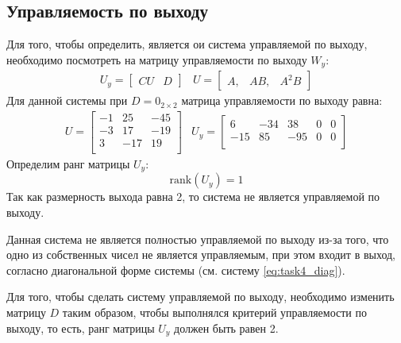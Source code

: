 \subsection{Управляемость по выходу}
Для того, чтобы определить, является ои система управляемой по выходу, необходимо посмотреть на 
матрицу управляемости по выходу $W_y$:
\begin{equation}
    \begin{array}{cc}
        U_y = \begin{bmatrix}
            CU & D
        \end{bmatrix} & 
        U = \begin{bmatrix}
            A, & AB, & A^2B
        \end{bmatrix} 
    \end{array}
\end{equation}
Для данной системы при $D = 0_{2\times 2}$ матрица управляемости по выходу равна: 
\begin{equation}
    \begin{array}{cc}
        U = \begin{bmatrix}
            -1  & 25  & -45 \\ 
            -3  & 17  & -19 \\ 
            3  & -17  & 19 \\ 
        \end{bmatrix} &
        U_y = \begin{bmatrix}
            6  & -34  & 38  & 0  & 0 \\ 
            -15  & 85  & -95  & 0  & 0 \\ 
        \end{bmatrix}
    \end{array}
\end{equation}
Определим ранг матрицы $U_y$:
\begin{equation}
    \text{rank}(U_y) = 1
\end{equation}
Так как размерность выхода равна 2, то система не является управляемой по выходу. 

Данная система не является полностью управляемой по выходу из-за того, что одно 
из собственных чисел не является управляемым, при этом входит в выход, согласно 
диагональной форме системы (см. систему \eqref{eq:task4_diag}).

Для того, чтобы сделать систему управляемой по выходу, необходимо изменить матрицу 
$D$ таким образом, чтобы выполнялся критерий управляемости по выходу, то есть, ранг 
матрицы $U_y$ должен быть равен 2. 

